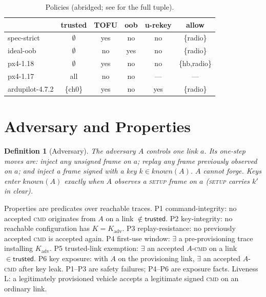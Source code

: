 \documentclass[conference]{IEEEtran}
\newcommand{\prop}[1]{\textsf{#1}}
\newtheorem{definition}{Definition}
\begin{document}
\begin{table}[t]
\caption{Policies (abridged; see \cite{brighouse2026signing} for the full tuple).}
\label{tab:pol}
\centering\footnotesize\setlength{\tabcolsep}{3pt}
\begin{tabular}{@{}lccccc@{}}
\toprule
 & trusted & TOFU & oob & u-rekey & allow \\
\midrule
\textsf{spec-strict}     & $\emptyset$ & yes & no  & no  & \{radio\}\\
\textsf{ideal-oob}       & $\emptyset$ & no  & yes & no  & \{radio\}\\
\textsf{px4-1.18}        & $\emptyset$ & yes & no  & no  & \{hb,radio\}\\
\textsf{px4-1.17}        & all         & no  & no  & --- & ---\\
\textsf{ardupilot-4.7.2} & \{ch0\}     & yes & no  & yes & \{radio\}\\
\bottomrule
\end{tabular}
\end{table}

\section{Adversary and Properties}
\label{sec:adv}

\begin{definition}[Adversary]
The adversary $A$ controls one link $a$. Its one-step moves are: inject any
unsigned frame on $a$; replay any frame previously observed on $a$; and inject a
frame signed with a key $k\in\mathit{known}(A)$. $A$ cannot forge. Keys enter
$\mathit{known}(A)$ exactly when $A$ observes a \textsc{setup} frame on $a$
(\textsc{setup} carries $k'$ in clear).
\end{definition}

Properties are predicates over reachable traces. \prop{P1}
command-integrity: no accepted \textsc{cmd} originates from $A$ on a link
$\notin\mathsf{trusted}$. \prop{P2} key-integrity: no reachable configuration has
$K=K_{\mathrm{adv}}$. \prop{P3} replay-resistance: no previously accepted
\textsc{cmd} is accepted again. \prop{P4} first-use window: $\exists$ a
pre-provisioning trace installing $K_{\mathrm{adv}}$. \prop{P5} trusted-link
exemption: $\exists$ an accepted $A$-\textsc{cmd} on a link
$\in\mathsf{trusted}$. \prop{P6} key exposure: with $A$ on the provisioning link,
$\exists$ an accepted $A$-\textsc{cmd} after key leak. \prop{P1}--\prop{P3} are
safety failures; \prop{P4}--\prop{P6} are exposure facts. Liveness
\prop{L}: a legitimately provisioned vehicle accepts a legitimate signed
\textsc{cmd} on an ordinary link.
\end{document}
